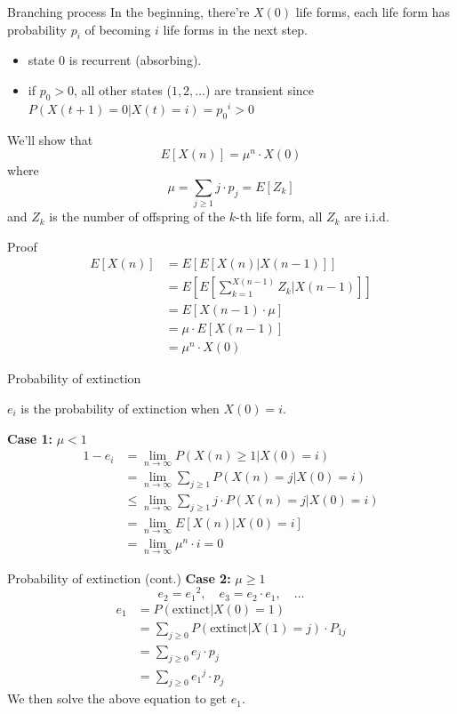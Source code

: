\documentclass[mathserif]{beamer}
\begin{document}
\begin{frame}{Branching process}
In the beginning, there're $X(0)$ life forms, 
each life form has probability $p_i$ of becoming $i$ life forms in the next step.
\begin{itemize}
\item state 0 is recurrent (absorbing).
\item if $p_0 > 0$, all other states ($1,2,\ldots$) are transient since\\
	$P(X(t+1)=0|X(t)=i) = {p_0}^i > 0$
\end{itemize}
We'll show that
\[
E[X(n)] = \mu^n \cdot X(0)
\]
where
\[
\mu = \sum_{j \geq 1} j \cdot p_j = E[Z_k]
\]
and $Z_k$ is the number of offspring of the $k$-th life form, all $Z_k$ are i.i.d.
\end{frame}

\begin{frame}{Proof}
\begin{align*}
E[X(n)] & = E[E[X(n)|X(n-1)]] \\
& = E\left[E\left[\sum_{k=1}^{X(n-1)} Z_k | X(n-1)\right]\right] \\
& = E[X(n-1) \cdot \mu] \\
& = \mu \cdot E[X(n-1)] \\
& = \mu^n \cdot X(0)
\end{align*}
\end{frame}

\begin{frame}{Probability of extinction}
\begin{definition}
$e_i$ is the probability of extinction when $X(0) = i$.
\end{definition}
\textbf{Case 1:} $\mu < 1$
\begin{align*}
1 - e_i & = \lim_{n\to\infty} P(X(n) \geq 1 | X(0) = i) \\
& = \lim_{n\to\infty} \sum_{j \geq 1} P(X(n) = j|X(0) = i) \\
& \leq \lim_{n\to\infty} \sum_{j \geq 1} j \cdot P(X(n) = j|X(0) = i) \\
& = \lim_{n\to\infty} E[X(n)|X(0)=i] \\
& = \lim_{n\to\infty} \mu^n \cdot i = 0
\end{align*}
\end{frame}

\begin{frame}{Probability of extinction (cont.)}
\textbf{Case 2:} $\mu \geq 1$ 
\[
e_2 = {e_1}^2,\quad  e_3 = e_2 \cdot e_1,\quad\ldots
\]
\begin{align*}
e_1 & = P(\text{extinct}|X(0) = 1) \\
& = \sum_{j \geq 0} P(\text{extinct}|X(1) = j) \cdot P_{1j} \\
& = \sum_{j \geq 0} e_j \cdot p_j \\
& = \sum_{j \geq 0} {e_1}^j \cdot p_j
\end{align*}
We then solve the above equation to get $e_1$.
\end{frame}
\end{document}
